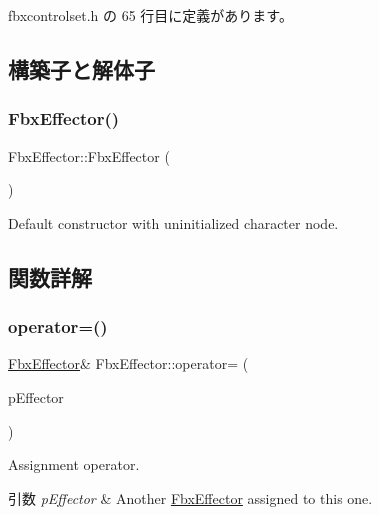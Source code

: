  fbxcontrolset.\+h の 65 行目に定義があります。



\subsection{構築子と解体子}
\mbox{\label{class_fbx_effector_affc3f712648fd0a776886da83e562170}} 
\subsubsection{\texorpdfstring{Fbx\+Effector()}{FbxEffector()}}
{\footnotesize\ttfamily Fbx\+Effector\+::\+Fbx\+Effector (\begin{DoxyParamCaption}{ }\end{DoxyParamCaption})}



Default constructor with uninitialized character node. 



\subsection{関数詳解}
\mbox{\label{class_fbx_effector_ac4d56e55ec719e7a8e20ac56df22ad0a}} 
\subsubsection{\texorpdfstring{operator=()}{operator=()}}
{\footnotesize\ttfamily \hyperlink{class_fbx_effector}{Fbx\+Effector}\& Fbx\+Effector\+::operator= (\begin{DoxyParamCaption}\item[{const \hyperlink{class_fbx_effector}{Fbx\+Effector} \&}]{p\+Effector }\end{DoxyParamCaption})}

Assignment operator. 
\begin{DoxyParams}{引数}
{\em p\+Effector} & Another \hyperlink{class_fbx_effector}{Fbx\+Effector} assigned to this one. \\
\hline
\end{DoxyParams}
\mbox{\label{class_fbx_effector_a9361ed2afd2c90fd0a74d81467205749}} 
